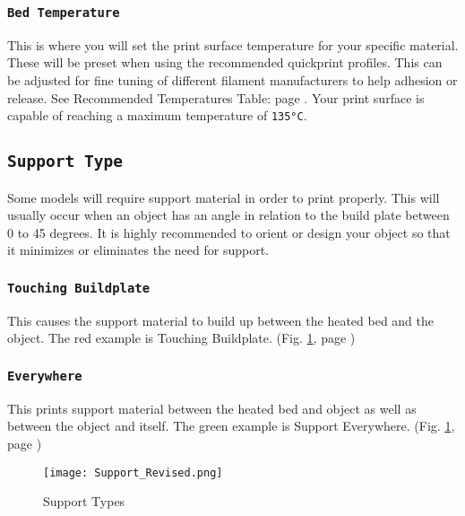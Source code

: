 \subsubsection{\texttt{Bed Temperature}}
This is where you will set the print surface temperature for your specific material. These will be preset when using the recommended quickprint profiles. This can be adjusted for fine tuning of different filament manufacturers to help adhesion or release. See Recommended Temperatures Table: page \pageref{tab:a}. Your print surface is capable of reaching a maximum temperature of \texttt{135°C}. 

\subsection{\texttt{Support Type}}
Some models will require support material in order to print properly. This will usually occur when an object has an angle in relation to the build plate between 0 to 45 degrees. It is highly recommended to orient or design your object so that it minimizes or eliminates the need for support.

\subsubsection{\texttt{Touching Buildplate}}
This causes the support material to build up between the heated bed and the object. The red example is Touching Buildplate. (Fig. \ref{fig:Different Types of Support}, page \pageref{fig:Different Types of Support}) 

\subsubsection{\texttt{Everywhere}}
This prints support material between the heated bed and object as well as between the object and itself. The green example is Support Everywhere. (Fig. \ref{fig:Different Types of Support}, page \pageref{fig:Different Types of Support})
\begin{figure}[H]
\centering
\texttt{[image: Support\_Revised.png]}
\caption{Support Types}
\label{fig:Different Types of Support}
\end{figure}

